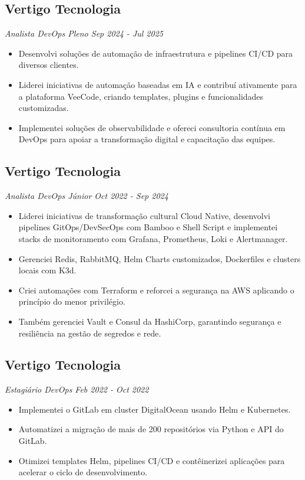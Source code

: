 \documentclass[a4paper,10pt]{article}
\begin{document}
\subsection*{\texorpdfstring{
\textbf{ Vertigo Tecnologia } \hfill 
}{
Vertigo Tecnologia -- 
}}
\textit{ Analista DevOps Pleno \hfill Sep 2024 - Jul 2025 }
\begin{itemize}
\item Desenvolvi soluções de automação de infraestrutura e pipelines CI/CD para diversos clientes.
\item Liderei iniciativas de automação baseadas em IA e contribuí ativamente para a plataforma VeeCode, criando templates, plugins e funcionalidades customizadas.
\item Implementei soluções de observabilidade e ofereci consultoria contínua em DevOps para apoiar a transformação digital e capacitação das equipes.
\end{itemize}
\subsection*{\texorpdfstring{
\textbf{ Vertigo Tecnologia } \hfill 
}{
Vertigo Tecnologia -- 
}}
\textit{ Analista DevOps Júnior \hfill Oct 2022 - Sep 2024 }
\begin{itemize}
\item Liderei iniciativas de transformação cultural Cloud Native, desenvolvi pipelines GitOps/DevSecOps com Bamboo e Shell Script e implementei stacks de monitoramento com Grafana, Prometheus, Loki e Alertmanager.
\item Gerenciei Redis, RabbitMQ, Helm Charts customizados, Dockerfiles e clusters locais com K3d.
\item Criei automações com Terraform e reforcei a segurança na AWS aplicando o princípio do menor privilégio.
\item Também gerenciei Vault e Consul da HashiCorp, garantindo segurança e resiliência na gestão de segredos e rede.
\end{itemize}
\subsection*{\texorpdfstring{
\textbf{ Vertigo Tecnologia } \hfill 
}{
Vertigo Tecnologia -- 
}}
\textit{ Estagiário DevOps \hfill Feb 2022 - Oct 2022 }
\begin{itemize}
\item Implementei o GitLab em cluster DigitalOcean usando Helm e Kubernetes.
\item Automatizei a migração de mais de 200 repositórios via Python e API do GitLab.
\item Otimizei templates Helm, pipelines CI/CD e contêinerizei aplicações para acelerar o ciclo de desenvolvimento.
\end{itemize}
\end{document}
